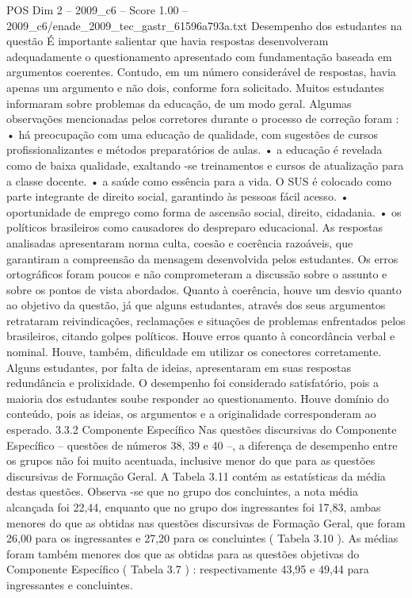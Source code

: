 \begin{textsample}{POS Dim 2 – 2009\_c6 – Score 1.00 – 2009\_c6/enade\_2009\_tec\_gastr\_61596a793a.txt}
Desempenho dos estudantes na questão É importante salientar que havia respostas desenvolveram adequadamente o questionamento apresentado com fundamentação baseada em argumentos coerentes.
Contudo, em um número considerável de respostas, havia apenas um argumento e não dois, conforme fora solicitado.
Muitos estudantes informaram sobre problemas da educação, de um modo geral.
Algumas observações mencionadas pelos corretores durante o processo de correção foram : • há preocupação com uma educação de qualidade, com sugestões de cursos profissionalizantes e métodos preparatórios de aulas. • a educação é revelada como de baixa qualidade, exaltando -se treinamentos e cursos de atualização para a classe docente. • a saúde como essência para a vida.
O SUS é colocado como parte integrante de direito social, garantindo às pessoas fácil acesso. • oportunidade de emprego como forma de ascensão social, direito, cidadania. • os políticos brasileiros como causadores do despreparo educacional.
As respostas analisadas apresentaram norma culta, coesão e coerência razoáveis, que garantiram a compreensão da mensagem desenvolvida pelos estudantes.
Os erros ortográficos foram poucos e não comprometeram a discussão sobre o assunto e sobre os pontos de vista abordados.
Quanto à coerência, houve um desvio quanto ao objetivo da questão, já que alguns estudantes, através dos seus argumentos retrataram reivindicações, reclamações e situações de problemas enfrentados pelos brasileiros, citando golpes políticos.
Houve erros quanto à concordância verbal e nominal.
Houve, também, dificuldade em utilizar os conectores corretamente.
Alguns estudantes, por falta de ideias, apresentaram em suas respostas redundância e prolixidade.
O desempenho foi considerado satisfatório, pois a maioria dos estudantes soube responder ao questionamento.
Houve domínio do conteúdo, pois as ideias, os argumentos e a originalidade corresponderam ao esperado. 3.3.2 Componente Específico Nas questões discursivas do Componente Específico – questões de números 38, 39 e 40 –, a diferença de desempenho entre os grupos não foi muito acentuada, inclusive menor do que para as questões discursivas de Formação Geral.
A Tabela 3.11 contém as estatísticas da média destas questões.
Observa -se que no grupo dos concluintes, a nota média alcançada foi 22,44, enquanto que no grupo dos ingressantes foi 17,83, ambas menores do que as obtidas nas questões discursivas de Formação Geral, que foram 26,00 para os ingressantes e 27,20 para os concluintes ( Tabela 3.10 ).
As médias foram também menores dos que as obtidas para as questões objetivas do Componente Específico ( Tabela 3.7 ) : respectivamente 43,95 e 49,44 para ingressantes e concluintes.

\end{textsample}
